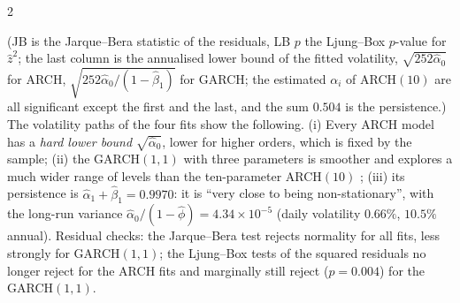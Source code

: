 \begin{paracol}{2}
\begin{secondary}
(JB is the Jarque--Bera statistic of the residuals, LB $p$ the Ljung--Box $p$-value for $\hat z^2$; the last column is the annualised lower bound of the fitted volatility, $\sqrt{252\hat\alpha_0}$ for ARCH, $\sqrt{252\hat\alpha_0/(1-\hat\beta_1)}$ for GARCH; the estimated
$\alpha_i$ of ARCH$(10)$ are all significant except the first and the last, and the sum $0.504$ is the persistence.) The volatility paths of the four fits 
show the following. (i) Every ARCH model has a \emph{hard lower bound} $\sqrt{\hat\alpha_0}$, lower for higher orders, which is fixed by the sample; (ii) the GARCH$(1,1)$ with three parameters is smoother and explores a much wider range of levels than
the ten-parameter ARCH$(10)$ ; (iii) its persistence is $\hat\alpha_1+\hat\beta_1=0.9970$: it is ``very close to being non-stationary'', with the long-run variance
$\hat\alpha_0/(1-\hat\phi)=4.34\times10^{-5}$ (daily volatility $0.66\%$, $10.5\%$ annual). Residual checks: the Jarque--Bera test rejects normality for all fits, less strongly for GARCH$(1,1)$; the Ljung--Box tests of the squared residuals no longer reject for the ARCH fits
and marginally still reject ($p=0.004$) for the GARCH$(1,1)$.


\end{secondary}
\end{paracol}
